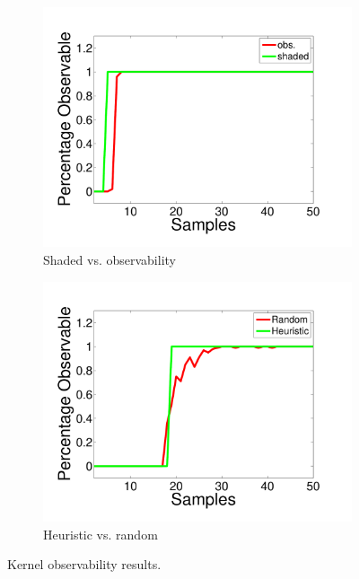 \documentclass[letterpaper,12pt,peerreviewca,draftcls]{IEEEtran}
\begin{document}
 
\begin{figure}
\centering
\begin{subfigure}[t]{0.48\textwidth}
	\includegraphics[width=\linewidth]{"Figure 9a.pdf"}
	\caption{Shaded vs. observability}
    	\label{fig:kobs_small}
\end{subfigure}

\begin{subfigure}[t]{0.48\textwidth}
	\includegraphics[width=\linewidth]{"Figure 9b.pdf"}
	\caption{Heuristic vs. random}
	\label{fig:sample_observability}
\end{subfigure}

\caption{Kernel observability results.}
\end{figure} 
\end{document}

